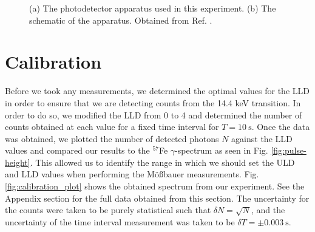\documentclass[a4paper]{report}
\numberwithin{equation}{section}
\begin{document}
\begin{figure}[htb!]
	\centering
	\quad
	\centering
	\caption{(a) The photodetector apparatus used in this experiment. (b) The schematic of the apparatus. Obtained from 
			Ref. \cite{k2212016}.}
	\label{fig:apparatus_raw}
\end{figure}


\chapter{Calibration} \label{sec:calibration}

Before we took any measurements, we determined the optimal values for the LLD in order to ensure that we are 
detecting counts from the 14.4 keV transition. In order to do so, we modified the LLD from 0 to 4 and determined the number 
of counts obtained at each value for a fixed time interval for $T = \SI{10}{\second}$. Once the data was obtained, 
we plotted the number of detected photons $N$ against the LLD values and compared our results to the $^{57}$Fe $\gamma$-spectrum as seen in Fig. \ref{fig:pulse-height}.
This allowed us to identify the range in which we should set the ULD and LLD values when performing the M\"o{\ss}bauer measurements. 
 Fig. \ref{fig:calibration_plot} shows the obtained spectrum from our experiment. See the Appendix section for the full data obtained from this 
 section. The uncertainty for the counts were taken to be purely statistical such that $\delta N = \sqrt{N}$, and the uncertainty 
 of the time interval measurement was taken to be $\delta T = \pm \SI{0.003}{\second}$. \par
\end{document}

